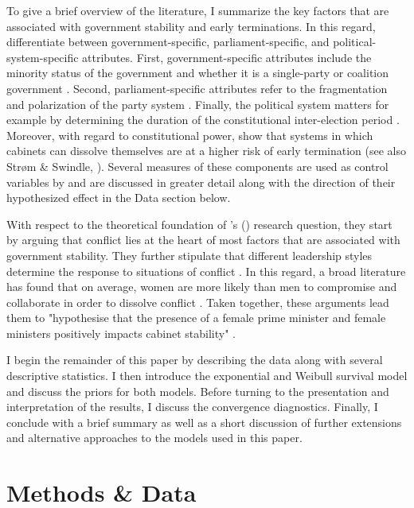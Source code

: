 \documentclass[11pt]{article}
\newcommand\possecite[1]{\citeauthor{#1}'s (\citeyear{#1})}
\begin{document}
To give a brief overview of the literature, I summarize the key factors that are associated with government stability and early terminations. In this regard, \textcite{SchleiterMorganJones2009} differentiate between government-specific, parliament-specific, and political-system-specific attributes. First, government-specific attributes include the minority status of the government and whether it is a single-party or coalition government \parencite{StromSwindle2002}. Second, parliament-specific attributes refer to the fragmentation and polarization of the party system \parencite{KingEtAl1990}. Finally, the political system matters for example by determining the duration of the constitutional inter-election period \parencite{StromSwindle2002}. Moreover, with regard to constitutional power, \textcite{SchleiterMorganJones2009} show that systems in which cabinets can dissolve themselves are at a higher risk of early termination (see also Strøm \& Swindle, \citeyear{StromSwindle2002}). Several measures of these components are used as control variables by \textcite{KK20} and are discussed in greater detail along with the direction of their hypothesized effect in the Data section below. 

With respect to the theoretical foundation of \possecite{KK20} research question, they start by arguing that conflict lies at the heart of most factors that are associated with government stability. They further stipulate that different leadership styles determine the response to situations of conflict \parencite{KK20}. In this regard, a broad literature has found that on average, women are more likely than men to compromise and collaborate in order to dissolve conflict \parencite[e.g.][]{KellermanRhode2017women}. Taken together, these arguments lead them to "hypothesise that the presence of a female prime minister and female ministers positively impacts cabinet stability" \parencite[4]{KK20}.

I begin the remainder of this paper by describing the data along with several descriptive statistics. I then introduce the exponential and Weibull survival model and discuss the priors for both models. Before turning to the presentation and interpretation of the results, I discuss the convergence diagnostics. Finally, I conclude with a brief summary as well as a short discussion of further extensions and alternative approaches to the models used in this paper.

\section{Methods \& Data}
\end{document}
